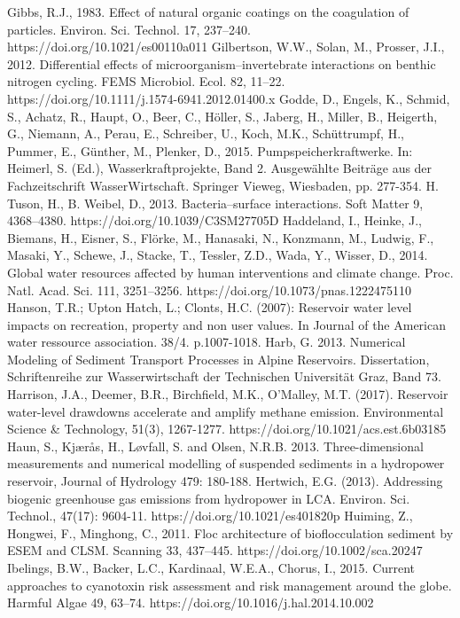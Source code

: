 \begin{thebibliography}{}
Gibbs, R.J., 1983. Effect of natural organic coatings on the coagulation of particles. Environ. Sci. Technol. 17, 237–240. https://doi.org/10.1021/es00110a011
Gilbertson, W.W., Solan, M., Prosser, J.I., 2012. Differential effects of microorganism–invertebrate interactions on benthic nitrogen cycling. FEMS Microbiol. Ecol. 82, 11–22. https://doi.org/10.1111/j.1574-6941.2012.01400.x
Godde, D., Engels, K., Schmid, S., Achatz, R., Haupt, O., Beer, C., Höller, S., Jaberg, H., Miller, B., Heigerth, G., Niemann, A., Perau, E., Schreiber, U., Koch, M.K., Schüttrumpf, H., Pummer, E., Günther, M., Plenker, D., 2015. Pumpspeicherkraftwerke. In: Heimerl, S. (Ed.), Wasserkraftprojekte, Band 2. Ausgewählte Beiträge aus der Fachzeitschrift WasserWirtschaft. Springer Vieweg, Wiesbaden, pp. 277-354.
H. Tuson, H., B. Weibel, D., 2013. Bacteria–surface interactions. Soft Matter 9, 4368–4380. https://doi.org/10.1039/C3SM27705D
Haddeland, I., Heinke, J., Biemans, H., Eisner, S., Flörke, M., Hanasaki, N., Konzmann, M., Ludwig, F., Masaki, Y., Schewe, J., Stacke, T., Tessler, Z.D., Wada, Y., Wisser, D., 2014. Global water resources affected by human interventions and climate change. Proc. Natl. Acad. Sci. 111, 3251–3256. https://doi.org/10.1073/pnas.1222475110
Hanson, T.R.; Upton Hatch, L.; Clonts, H.C. (2007): Reservoir water level impacts on recreation, property and non user values. In Journal of the American water ressource association. 38/4. p.1007-1018.
Harb, G. 2013. Numerical Modeling of Sediment Transport Processes in Alpine Reservoirs. Dissertation, Schriftenreihe zur Wasserwirtschaft der Technischen Universität Graz, Band 73.
Harrison, J.A., Deemer, B.R., Birchfield, M.K., O'Malley, M.T. (2017). Reservoir water-level drawdowns accelerate and amplify methane emission. Environmental Science & Technology, 51(3), 1267-1277. https://doi.org/10.1021/acs.est.6b03185
Haun, S., Kjærås, H., Løvfall, S. and Olsen, N.R.B. 2013. Three-dimensional measurements and numerical modelling of suspended sediments in a hydropower reservoir, Journal of Hydrology 479: 180-188.
Hertwich, E.G. (2013). Addressing biogenic greenhouse gas emissions from hydropower in LCA. Environ. Sci. Technol., 47(17): 9604-11. https://doi.org/10.1021/es401820p
Huiming, Z., Hongwei, F., Minghong, C., 2011. Floc architecture of bioflocculation sediment by ESEM and CLSM. Scanning 33, 437–445. https://doi.org/10.1002/sca.20247
Ibelings, B.W., Backer, L.C., Kardinaal, W.E.A., Chorus, I., 2015. Current approaches to cyanotoxin risk assessment and risk management around the globe. Harmful Algae 49, 63–74. https://doi.org/10.1016/j.hal.2014.10.002

\end{thebibliography}

